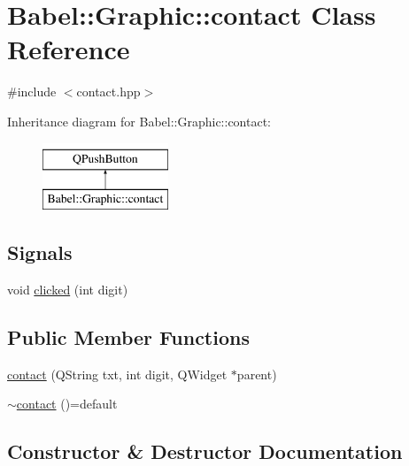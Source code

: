 \hypertarget{classBabel_1_1Graphic_1_1contact}{}\section{Babel\+:\+:Graphic\+:\+:contact Class Reference}
\label{classBabel_1_1Graphic_1_1contact}


{\ttfamily \#include $<$contact.\+hpp$>$}

Inheritance diagram for Babel\+:\+:Graphic\+:\+:contact\+:\begin{figure}[H]
\begin{center}
\leavevmode
\includegraphics[height=2.000000cm]{classBabel_1_1Graphic_1_1contact}
\end{center}
\end{figure}
\subsection*{Signals}
\begin{DoxyCompactItemize}
\item 
void \hyperlink{classBabel_1_1Graphic_1_1contact_a47fd9666942e7f530f0eafb0c39ab339}{clicked} (int digit)
\end{DoxyCompactItemize}
\subsection*{Public Member Functions}
\begin{DoxyCompactItemize}
\item 
\hyperlink{classBabel_1_1Graphic_1_1contact_af38edde7e26d704222b1c178d926000b}{contact} (Q\+String txt, int digit, Q\+Widget $\ast$parent)
\item 
\hyperlink{classBabel_1_1Graphic_1_1contact_a6f75d27fd675dea94846dbc0bcf94106}{$\sim$contact} ()=default
\end{DoxyCompactItemize}


\subsection{Constructor \& Destructor Documentation}
\mbox{\label{classBabel_1_1Graphic_1_1contact_af38edde7e26d704222b1c178d926000b}} 
